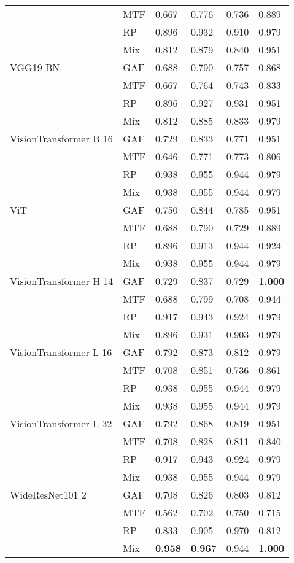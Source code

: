 \begin{tabular}[t]{llllll}
 & MTF & 0.667 & 0.776 & 0.736 & 0.889 \\
 & RP & 0.896 & 0.932 & 0.910 & 0.979 \\
 & Mix & 0.812 & 0.879 & 0.840 & 0.951 \\
VGG19 BN & GAF & 0.688 & 0.790 & 0.757 & 0.868 \\
 & MTF & 0.667 & 0.764 & 0.743 & 0.833 \\
 & RP & 0.896 & 0.927 & 0.931 & 0.951 \\
 & Mix & 0.812 & 0.885 & 0.833 & 0.979 \\
VisionTransformer B 16 & GAF & 0.729 & 0.833 & 0.771 & 0.951 \\
 & MTF & 0.646 & 0.771 & 0.773 & 0.806 \\
 & RP & 0.938 & 0.955 & 0.944 & 0.979 \\
 & Mix & 0.938 & 0.955 & 0.944 & 0.979 \\
ViT & GAF & 0.750 & 0.844 & 0.785 & 0.951 \\
 & MTF & 0.688 & 0.790 & 0.729 & 0.889 \\
 & RP & 0.896 & 0.913 & 0.944 & 0.924 \\
 & Mix & 0.938 & 0.955 & 0.944 & 0.979 \\
VisionTransformer H 14 & GAF & 0.729 & 0.837 & 0.729 & \textbf{1.000} \\
 & MTF & 0.688 & 0.799 & 0.708 & 0.944 \\
 & RP & 0.917 & 0.943 & 0.924 & 0.979 \\
 & Mix & 0.896 & 0.931 & 0.903 & 0.979 \\
VisionTransformer L 16 & GAF & 0.792 & 0.873 & 0.812 & 0.979 \\
 & MTF & 0.708 & 0.851 & 0.736 & 0.861 \\
 & RP & 0.938 & 0.955 & 0.944 & 0.979 \\
 & Mix & 0.938 & 0.955 & 0.944 & 0.979 \\
VisionTransformer L 32 & GAF & 0.792 & 0.868 & 0.819 & 0.951 \\
 & MTF & 0.708 & 0.828 & 0.811 & 0.840 \\
 & RP & 0.917 & 0.943 & 0.924 & 0.979 \\
 & Mix & 0.938 & 0.955 & 0.944 & 0.979 \\
WideResNet101 2 & GAF & 0.708 & 0.826 & 0.803 & 0.812 \\
 & MTF & 0.562 & 0.702 & 0.750 & 0.715 \\
 & RP & 0.833 & 0.905 & 0.970 & 0.812 \\
 & Mix & \textbf{0.958} & \textbf{0.967} & 0.944 & \textbf{1.000} \\
\bottomrule
\end{tabular}

